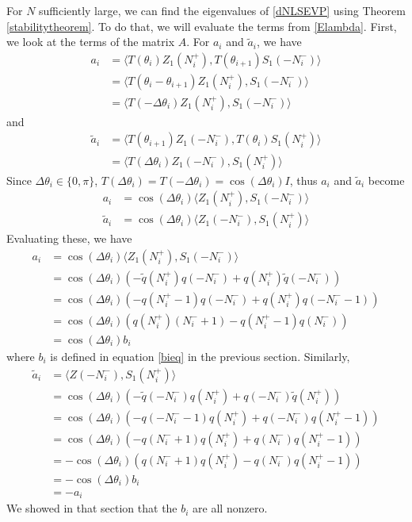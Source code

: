 \documentclass[12pt]{article}
\begin{document}
For $N$ sufficiently large, we can find the eigenvalues of \eqref{dNLSEVP} using Theorem \ref{stabilitytheorem}. To do that, we will evaluate the terms from \eqref{Elambda}. First, we look at the terms of the matrix $A$. For $a_i$ and $\tilde{a}_i$, we have
\begin{align*}
a_i &= \langle T(\theta_i) Z_1(N_i^+), T(\theta_{i+1}) S_1(-N_i^-) \rangle \\
&= \langle T(\theta_i - \theta_{i+1}) Z_1(N_i^+), S_1(-N_i^-) \rangle \\
&= \langle T(-\Delta\theta_i)Z_1(N_i^+), S_1(-N_i^-) \rangle
\end{align*}
and
\begin{align*}
\tilde{a}_i &= \langle T(\theta_{i+1}) Z_1(-N_i^-), T(\theta_i) S_1(N_i^+) \rangle \\
&= \langle T(\Delta \theta_i) Z_1(-N_i^-), S_1(N_i^+) \rangle
\end{align*}
Since $\Delta\theta_i \in \{0, \pi\}$, $T(\Delta\theta_i) = T(-\Delta\theta_i) = \cos(\Delta\theta_i)I$, thus $a_i$ and $\tilde{a}_i$ become
\begin{align*}
a_i &= \cos(\Delta\theta_i) \langle Z_1(N_i^+), S_1(-N_i^-) \rangle \\
\tilde{a}_i &= \cos(\Delta\theta_i) \langle Z_1(-N_i^-), S_1(N_i^+) \rangle
\end{align*}
Evaluating these, we have
\begin{align*}
a_i &= \cos(\Delta\theta_i)\langle Z_1(N_i^+), S_1(-N_i^-) \rangle \\
&= \cos(\Delta\theta_i)(-\tilde{q}(N_i^+)q(-N_i^-) + q(N_i^+)\tilde{q}(-N_i^-)) \\
&= \cos(\Delta\theta_i)(-q(N_i^+ - 1)q(-N_i^-) + q(N_i^+)q(-N_i^- - 1) )\\
&= \cos(\Delta\theta_i)( q(N_i^+)(N_i^- + 1) - q(N_i^+ - 1)q(N_i^-) )\\
&= \cos(\Delta\theta_i) b_i
\end{align*}
where $b_i$ is defined in equation \eqref{bieq} in the previous section. Similarly,
\begin{align*}
\tilde{a}_i &= \langle Z(-N_i^-), S_1(N_i^+) \rangle \\
&= \cos(\Delta\theta_i)(-\tilde{q}(-N_i^-)q(N_i^+) + q(-N_i^-)\tilde{q}(N_i^+)) \\
&= \cos(\Delta\theta_i)(-q(-N_i^- - 1)q(N_i^+) + q(-N_i^-)q(N_i^+ - 1)) \\
&= \cos(\Delta\theta_i)(-q(N_i^- + 1)q(N_i^+) + q(N_i^-)q(N_i^+ - 1)) \\
&= -\cos(\Delta\theta_i)(q(N_i^- + 1)q(N_i^+) - q(N_i^-)q(N_i^+ - 1)) \\
&= -\cos(\Delta\theta_i) b_i \\
&= -a_i
\end{align*}
We showed in that section that the $b_i$ are all nonzero.
\end{document}
